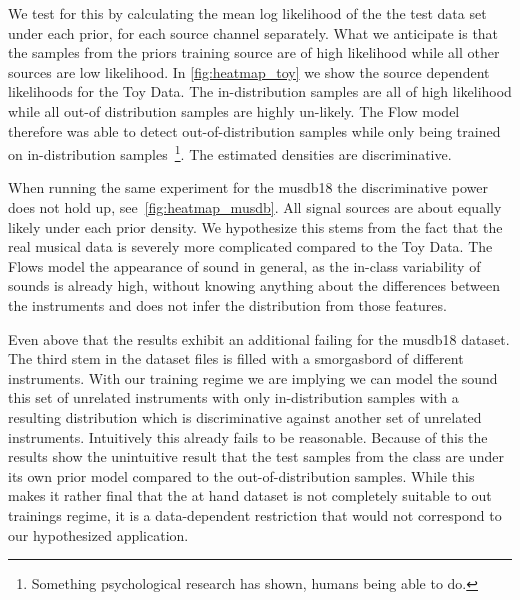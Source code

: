 
We test for this by calculating the mean log likelihood of the the test data set under each prior, for each source channel separately. What we anticipate is that the samples from the priors training source are of high likelihood while all other sources are low likelihood. In \cref{fig:heatmap_toy} we show the source dependent likelihoods for the Toy Data. The in-distribution samples are all of high likelihood while all out-of distribution samples are highly un-likely. The Flow model therefore was able to detect out-of-distribution samples while only being trained on in-distribution samples~\footnote{Something psychological research has shown, humans being able to do.}. The estimated densities are discriminative.

When running the same experiment for the musdb18 the discriminative power does not hold up, see~\cref{fig:heatmap_musdb}. All signal sources are about equally likely under each prior density. We hypothesize this stems from the fact that the real musical data is severely more complicated compared to the Toy Data. The Flows model the appearance of sound in general, as the in-class variability of sounds is already high, without knowing anything about the  differences between the instruments and does not infer the distribution from those features.


Even above that the results exhibit an additional failing for the musdb18 dataset. The third stem in the dataset files  is filled with a smorgasbord of different instruments. With our training regime we are implying we can model the sound this set of unrelated instruments with only in-distribution samples with a resulting distribution which is discriminative against another set of unrelated instruments. Intuitively this already fails to be reasonable. Because of this the results show the unintuitive result that the test samples from the  class are  under its own prior model compared to the out-of-distribution samples. While this makes it rather final that the at hand dataset is not completely suitable to out trainings regime, it is a data-dependent restriction that would not correspond to our hypothesized application.

